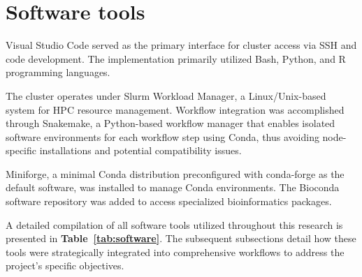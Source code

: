 \section{Software tools}

Visual Studio Code served as the primary interface for cluster access via SSH 
and code development. The implementation primarily utilized Bash, Python, and R 
programming languages.

The cluster operates under Slurm Workload Manager, a Linux/Unix-based system for 
HPC resource management. Workflow integration was accomplished through 
Snakemake, a Python-based workflow manager that enables isolated software 
environments for each workflow step using Conda, thus avoiding node-specific 
installations and potential compatibility issues.

Miniforge, a minimal Conda distribution preconfigured with conda-forge as the 
default software, was installed to manage Conda environments. The Bioconda 
software repository was added to access specialized bioinformatics packages.

A detailed compilation of all software tools utilized throughout this research
is presented in \textbf{Table~\ref{tab:software}}. The subsequent subsections 
detail how these tools were strategically integrated into comprehensive 
workflows to address the project's specific objectives.




